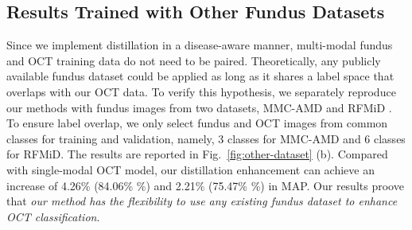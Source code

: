 \documentclass[runningheads]{llncs}
\newcommand{\wdai}[1]{{\color[rgb]{0.9,0.1,0.1}{#1}}}
\newcommand{\wdaicmnt}[1]{{\color[rgb]{0.9,0.1,0.1}{(WD:#1)}}}
\begin{document}

\subsection{Results Trained with Other Fundus Datasets}

Since we implement distillation in a disease-aware manner, multi-modal fundus and OCT training data do not need to be paired. Theoretically, any publicly available fundus dataset could be applied as long as it shares a label space that overlaps with our OCT data. To verify this hypothesis, we separately reproduce our methods with fundus images from two datasets, MMC-AMD \cite{wang2022learning} and RFMiD \cite{pachade2021retinal}. %
To ensure label overlap, we only select fundus and OCT images from common classes for training and validation, namely, 3 classes for MMC-AMD and 6 classes for RFMiD.
The results are reported in Fig.~\ref{fig:other-dataset} (b). Compared with single-modal OCT model, our distillation enhancement can achieve an increase of 4.26\% (84.06\% \%) and 2.21\% (75.47\% \%) in MAP. Our results proove that \textit{our method has the flexibility to use any existing fundus dataset to enhance OCT classification}.

\mydata


\mydatatransfer
\end{document}
